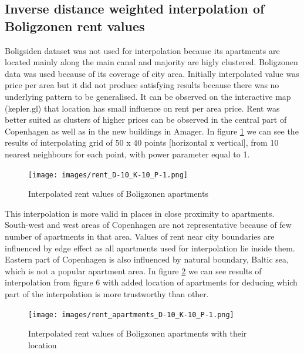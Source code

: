 \documentclass{article}
\begin{document}
\subsection{Inverse distance weighted interpolation of Boligzonen rent values}
Boligsiden dataset was not used for interpolation because its apartments are located mainly along the main canal and majority are higly clustered. Boligzonen data was used because of its coverage of city area. Initially interpolated value was price per area but it did not produce satisfying results because there was no underlying pattern to be generalised. It can be observed on the interactive map (kepler.gl) that location has small influence on rent per area price. Rent was better suited as clusters of higher prices can be observed in the central part of Copenhagen as well as in the new buildings in Amager. In figure \ref{fig:interpol} we can see the results of interpolating grid of 50 x 40 points [horizontal x vertical], from 10 nearest neighbours for each point, with power parameter equal to 1.
\begin{figure}[!htbp]
    \centering
    \texttt{[image: images/rent\_D-10\_K-10\_P-1.png]}
    \caption{Interpolated rent values of Boligzonen apartments}
    \label{fig:interpol}
\end{figure}
This interpolation is more valid in places in close proximity to apartments. South-west and west areas of Copenhagen are not representative because of few number of apartments in that area. Values of rent near city boundaries are influenced by edge effect as all apartments used for interpolation lie inside them. Eastern part of Copenhagen is also influenced by natural boundary, Baltic sea, which is not a popular apartment area. In figure \ref{fig:interpol_apart} we can see results of interpolation from figure 6 with added location of apartments for deducing which part of the interpolation is more trustworthy than other.

\begin{figure}[!htbp]
    \centering
    \texttt{[image: images/rent\_apartments\_D-10\_K-10\_P-1.png]}
    \caption{Interpolated rent values of Boligzonen apartments with their location}
    \label{fig:interpol_apart}
\end{figure}


\end{document}
